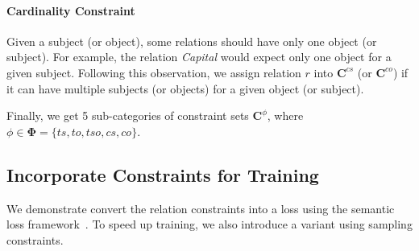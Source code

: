 
\paragraph{Cardinality Constraint}
Given a subject (or object), some relations should have only one object (or subject).
For example, the relation \emph{Capital} would expect only one object for a given subject.
Following this observation, we assign relation $r$ into $\bm{C}^{cs}$ (or $\bm{C}^{co}$) if it can have multiple subjects (or objects) for a given object (or subject).



Finally, we get 5 sub-categories of constraint sets $\bm{C}^{\phi}$, where $\phi \in\bm{\Phi}=\{ts, to, tso, cs, co\}$.

\subsection{Incorporate  Constraints for Training}
\label{sec:loss_term}
We demonstrate convert the relation constraints into a loss using the semantic loss framework~\cite{xu2017semantic}.
To speed up training, we also introduce a variant using sampling constraints.

